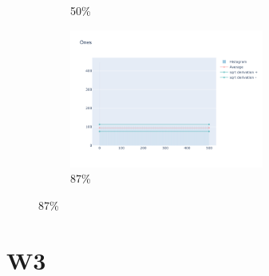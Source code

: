 \documentclass[12pt, fleqn]{report}                             %
\theoremstyle{break}                                            %
\begin{document}
\begin{figure}[h!]
\begin{subfigure}[b]{0.4\linewidth}
            \caption{50\%}
          \end{subfigure}
          \begin{subfigure}[b]{0.4\linewidth}
            \includegraphics[width=0.7\textwidth]{Images/108/dia-d.png}
            \caption{87\%}
          \end{subfigure}
        \end{figure}


      \section{W3}
\end{document}
